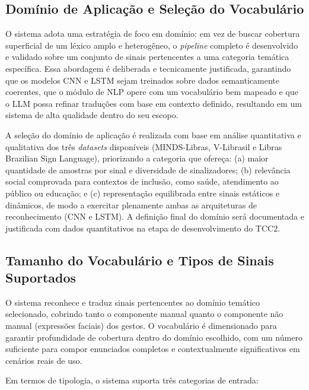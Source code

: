 \documentclass[
    12pt,                %
    openright,           %
    oneside,             %
    a4paper,             %
    english,             %
    brazil               %
]{abntex2}
\begin{document}
\subsection{Domínio de Aplicação e Seleção do Vocabulário}
O sistema adota uma estratégia de foco em domínio: em vez de buscar cobertura superficial de um léxico amplo e heterogêneo, o \textit{pipeline} completo é desenvolvido e validado sobre um conjunto de sinais pertencentes a uma categoria temática específica. Essa abordagem é deliberada e tecnicamente justificada, garantindo que os modelos CNN e LSTM sejam treinados sobre dados semanticamente coerentes, que o módulo de NLP opere com um vocabulário bem mapeado e que o LLM possa refinar traduções com base em contexto definido, resultando em um sistema de alta qualidade dentro do seu escopo.

A seleção do domínio de aplicação é realizada com base em análise quantitativa e qualitativa dos três \textit{datasets} disponíveis (MINDS-Libras, V-Librasil e Libras Brazilian Sign Language), priorizando a categoria que ofereça: (a) maior quantidade de amostras por sinal e diversidade de sinalizadores; (b) relevância social comprovada para contextos de inclusão, como saúde, atendimento ao público ou educação; e (c) representação equilibrada entre sinais estáticos e dinâmicos, de modo a exercitar plenamente ambas as arquiteturas de reconhecimento (CNN e LSTM). A definição final do domínio será documentada e justificada com dados quantitativos na etapa de desenvolvimento do TCC2.

\subsection{Tamanho do Vocabulário e Tipos de Sinais Suportados}

O sistema reconhece e traduz sinais pertencentes ao domínio temático selecionado, cobrindo tanto o componente manual quanto o componente não manual (expressões faciais) dos gestos. O vocabulário é dimensionado para garantir profundidade de cobertura dentro do domínio escolhido, com um número suficiente para compor enunciados completos e contextualmente significativos em cenários reais de uso.

Em termos de tipologia, o sistema suporta três categorias de entrada:
\end{document}
